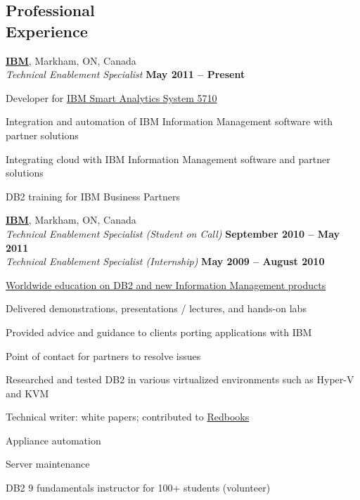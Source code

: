 \documentclass[margin,line]{resume}
\begin{document}
\begin{resume}
\section{\mysidestyle Professional\\Experience}

	\textbf{\href{http://www.ibm.com/}{IBM}}, Markham, ON, Canada					\vspace{2mm}\\\vspace{1mm}
	\textsl{Technical Enablement Specialist}				\hfill\textbf{May 2011 -- Present}		\\\vspace{-3mm}
	\begin{list2}
		\item Developer for \href{http://www-01.ibm.com/software/data/infosphere/smart-analytics-system/5710/}{IBM Smart Analytics System 5710}
		\item Integration and automation of IBM Information Management software with partner solutions
		\item Integrating cloud with IBM Information Management software and partner solutions
		\item DB2 training for IBM Business Partners
	\end{list2}
	\textbf{\href{http://www.ibm.com/}{IBM}}, Markham, ON, Canada					\vspace{2mm}\\\vspace{1mm}
	\textsl{Technical Enablement Specialist (Student on Call)}		\hfill\textbf{September 2010 -- May 2011}	\\
	\textsl{\hspace*{1.0mm}Technical Enablement Specialist (Internship)}	\hfill\textbf{May 2009 -- August 2010}		\\\vspace{-1.5mm}
	\begin{list2}
		\item \href{http://www.ibm.com/developerworks/data/bootcamps}{Worldwide education on DB2 and new Information Management products}
		\item Delivered demonstrations, presentations / lectures, and hands-on labs
		\item Provided advice and guidance to clients porting applications with IBM
		\item Point of contact for partners to resolve issues
		\item Researched and tested DB2 in various virtualized environments such as Hyper-V and KVM
		\item Technical writer: white papers; contributed to \href{http://www.redbooks.ibm.com/abstracts/sg247805.html}{Redbooks}
		\item Appliance automation
		\item Server maintenance
		\item DB2 9 fundamentals instructor for 100+ students (volunteer)
	\end{list2}


\end{resume}
\end{document}
